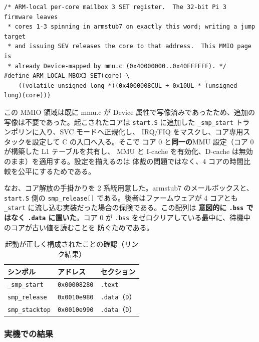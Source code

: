 \begin{lstlisting}[caption={ARM ローカルのコア別メールボックス 3（\texttt{system/platforms/arm-rpi3/smp.c}）}]
/* ARM-local per-core mailbox 3 SET register.  The 32-bit Pi 3 firmware leaves
 * cores 1-3 spinning in armstub7 on exactly this word; writing a jump target
 * and issuing SEV releases the core to that address.  This MMIO page is
 * already Device-mapped by mmu.c (0x40000000..0x40FFFFFF). */
#define ARM_LOCAL_MBOX3_SET(core) \
    ((volatile unsigned long *)(0x4000008CUL + 0x10UL * (unsigned long)(core)))
\end{lstlisting}

\noindent
この MMIO 領域は既に mmu.c が Device 属性で写像済みであったため、追加の
写像は不要であった。起こされたコアは \texttt{start.S} に追加した
\texttt{\_smp\_start} トランポリンに入り、SVC モードへ正規化し、
IRQ/FIQ をマスクし、コア専用スタックを設定して C の入口へ入る。そこで
コア 0 と\textbf{同一の}MMU 設定（コア 0 が構築した L1 テーブルを共有し、
MMU と I-cache を有効化、D-cache は無効のまま）を適用する。設定を揃えるのは
体裁の問題ではなく、4 コアの時間比較を公平にするためである。

なお、コア解放の手掛かりを 2 系統用意した。armstub7 のメールボックスと、
\texttt{start.S} 側の \texttt{smp\_release[]} である。後者はファームウェアが
4 コアとも \texttt{\_start} に流し込む実装だった場合の保険である。この配列は
\textbf{意図的に \texttt{.bss} ではなく \texttt{.data} に置いた}。コア 0 が
\texttt{.bss} をゼロクリアしている最中に、待機中のコアが古い値を読むことを
防ぐためである。

\begin{table}[htbp]
\centering
\caption{起動が正しく構成されたことの確認（リンク結果）}
\small
\begin{tabular}{@{}lll@{}}
\toprule
シンボル & アドレス & セクション \\
\midrule
\texttt{\_smp\_start}   & \texttt{0x00008280} & \texttt{.text} \\
\texttt{smp\_release}   & \texttt{0x0010e980} & \texttt{.data}（\texttt{D}）\\
\texttt{smp\_stacktop}  & \texttt{0x0010e990} & \texttt{.data}（\texttt{D}）\\
\bottomrule
\end{tabular}
\end{table}

\subsubsection*{実機での結果}

